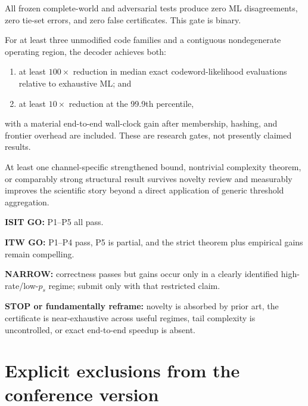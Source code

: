 \documentclass[11pt]{article}
\theoremstyle{definition}
\theoremstyle{remark}
\begin{document}
\begin{gatebox}
All frozen complete-world and adversarial tests produce zero ML disagreements, zero tie-set errors, and zero false certificates. This gate is binary.
\end{gatebox}

\begin{gatebox}
For at least three unmodified code families and a contiguous nondegenerate operating region, the decoder achieves both:
\begin{enumerate}
  \item at least $100\times$ reduction in median exact codeword-likelihood evaluations relative to exhaustive ML; and
  \item at least $10\times$ reduction at the 99.9th percentile,
\end{enumerate}
with a material end-to-end wall-clock gain after membership, hashing, and frontier overhead are included. These are research gates, not presently claimed results.
\end{gatebox}

\begin{gatebox}
At least one channel-specific strengthened bound, nontrivial complexity theorem, or comparably strong structural result survives novelty review and measurably improves the scientific story beyond a direct application of generic threshold aggregation.
\end{gatebox}

\begin{stopbox}
\textbf{ISIT GO:} P1--P5 all pass.\par
\textbf{ITW GO:} P1--P4 pass, P5 is partial, and the strict theorem plus empirical gains remain compelling.\par
\textbf{NARROW:} correctness passes but gains occur only in a clearly identified high-rate/low-$p_s$ regime; submit only with that restricted claim.\par
\textbf{STOP or fundamentally reframe:} novelty is absorbed by prior art, the certificate is near-exhaustive across useful regimes, tail complexity is uncontrolled, or exact end-to-end speedup is absent.
\end{stopbox}

\section{Explicit exclusions from the conference version}
\end{document}
